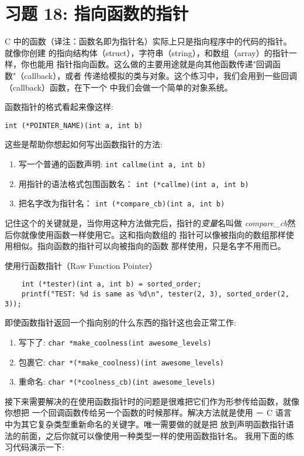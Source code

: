 \chapter{习题 18: 指向函数的指针}

C 中的函数（译注：函数名即为指针名）实际上只是指向程序中的代码的指针。就像你创建
的指向结构体（struct），字符串（string），和数组（array）的指针一样，你也能用
指针指向函数。这么做的主要用途就是向其他函数传递"回调函数"（callback），或者
传递给模拟的类与对象。这个练习中，我们会用到一些回调（callback）函数，在下一个
中我们会做一个简单的对象系统。

函数指针的格式看起来像这样:

\verb|int (*POINTER_NAME)(int a, int b)|

这些是帮助你想起如何写出函数指针的方法:

\begin{enumerate}
\item 写一个普通的函数声明: \verb|int callme(int a, int b)|
\item 用指针的语法格式包围函数名： \verb|int (*callme)(int a, int b)|
\item 把名字改为指针名： \verb|int (*compare_cb)(int a, int b)|
\end{enumerate}

记住这个的关键就是，当你用这种方法做完后，指针的\emph{变量}名叫做 
\emph{compare\_cb}然后你就像使用函数一样使用它。这和指向数组的
指针可以像被指向的数组那样使用相似。指向函数的指针可以向被指向的函数
那样使用，只是名字不用而已。

\begin{code}{使用行函数指针（Raw Function Pointer）}
\begin{lstlisting}
    int (*tester)(int a, int b) = sorted_order;
    printf("TEST: %d is same as %d\n", tester(2, 3), sorted_order(2, 3)); 
\end{lstlisting}
\end{code}

即使函数指针返回一个指向别的什么东西的指针这也会正常工作:

\begin{enumerate}
\item 写下了: \verb|char *make_coolness(int awesome_levels)|
\item 包裹它: \verb|char *(*make_coolness)(int awesome_levels)|
\item 重命名: \verb|char *(*coolness_cb)(int awesome_levels)|
\end{enumerate}

接下来需要解决的在使用函数指针时的问题是很难把它们作为形参传给函数，就像你想把
一个回调函数传给另一个函数的时候那样。解决方法就是使用 － C 
语言中为其它复杂类型重新命名的关键字。唯一需要做的就是把   
放到声明函数指针语法的前面，之后你就可以像使用一种类型一样的使用函数指针名。
我用下面的练习代码演示一下:

